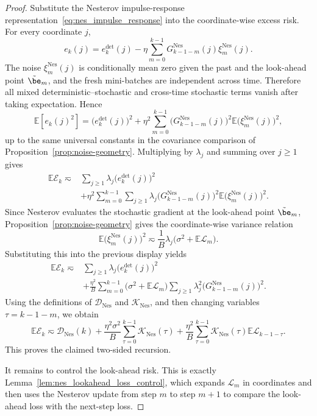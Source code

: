 \begin{proof}
Substitute the Nesterov impulse-response representation~\eqref{eq:nes_impulse_response} into the coordinate-wise excess risk.  For every coordinate
\(j\),
\[
    e_k(j)
    =
    e_k^{\mathrm{det}}(j)
    -\eta\sum_{m=0}^{k-1}G_{k-1-m}^{\mathrm{Nes}}(j)\xi_m^{\mathrm{Nes}}(j).
\]
The noise \(\xi_m^{\mathrm{Nes}}(j)\) is conditionally mean zero given the past and the look-ahead point
\(\tilde\be_m\), and the fresh mini-batches are independent across time.  Therefore all mixed
deterministic--stochastic and cross-time stochastic terms vanish after taking expectation.  Hence
\[
    \mathbb{E}[e_k(j)^2]
    =
    \bigl(e_k^{\mathrm{det}}(j)\bigr)^2
    +
    \eta^2\sum_{m=0}^{k-1}
    \bigl(G_{k-1-m}^{\mathrm{Nes}}(j)\bigr)^2
    \mathbb{E}\bigl(\xi_m^{\mathrm{Nes}}(j)\bigr)^2,
\]
up to the same universal constants in the covariance comparison of Proposition~\ref{prop:noise-geometry}.  Multiplying by
\(\lambda_j\) and summing over \(j\ge1\) gives
\[
\begin{aligned}
    \mathbb{E}\mathcal E_k
    \eqsim{}&
    \sum_{j\ge1}\lambda_j\bigl(e_k^{\mathrm{det}}(j)\bigr)^2 \\
    &+
    \eta^2\sum_{m=0}^{k-1}\sum_{j\ge1}
    \lambda_j
    \bigl(G_{k-1-m}^{\mathrm{Nes}}(j)\bigr)^2
    \mathbb{E}\bigl(\xi_m^{\mathrm{Nes}}(j)\bigr)^2 .
\end{aligned}
\]
Since Nesterov evaluates the stochastic gradient at the look-ahead point \(\tilde\be_m\),
Proposition~\ref{prop:noise-geometry} gives the coordinate-wise variance relation
\[
    \mathbb{E}\bigl(\xi_m^{\mathrm{Nes}}(j)\bigr)^2
    \eqsim
    \frac{1}{B}\lambda_j\bigl(\sigma^2+\mathbb{E}\mathcal L_m\bigr).
\]
Substituting this into the previous display yields
\[
\begin{aligned}
    \mathbb{E}\mathcal E_k
    \eqsim{}&
    \sum_{j\ge1}\lambda_j\bigl(e_k^{\mathrm{det}}(j)\bigr)^2 \\
    &+
    \frac{\eta^2}{B}\sum_{m=0}^{k-1}
    \bigl(\sigma^2+\mathbb{E}\mathcal L_m\bigr)
    \sum_{j\ge1}\lambda_j^2
    \bigl(G_{k-1-m}^{\mathrm{Nes}}(j)\bigr)^2 .
\end{aligned}
\]
Using the definitions of \(\mathcal D_{\mathrm{Nes}}\) and \(\mathcal K_{\mathrm{Nes}}\), and then changing
variables \(\tau=k-1-m\), we obtain
\[
    \mathbb{E}\mathcal E_k
    \eqsim
    \mathcal D_{\mathrm{Nes}}(k)
    +
    \frac{\eta^2\sigma^2}{B}\sum_{\tau=0}^{k-1}\mathcal K_{\mathrm{Nes}}(\tau)
    +
    \frac{\eta^2}{B}\sum_{\tau=0}^{k-1}\mathcal K_{\mathrm{Nes}}(\tau)
    \mathbb{E}\mathcal L_{k-1-\tau}.
\]
This proves the claimed two-sided recursion.

It remains to control the look-ahead risk.  This is exactly Lemma~\ref{lem:nes_lookahead_loss_control},
which expands \(\mathcal L_m\) in coordinates and then uses the Nesterov update from step \(m\) to step
\(m+1\) to compare the look-ahead loss with the next-step loss.
\end{proof}


